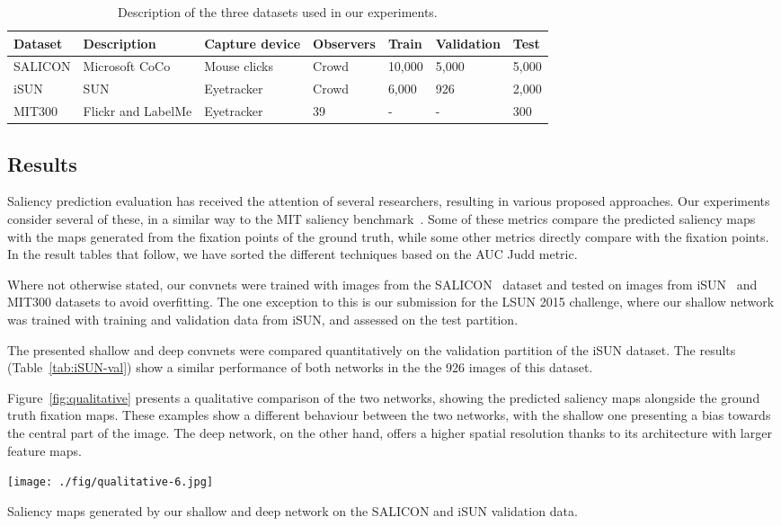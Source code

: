 \documentclass[10pt,twocolumn,letterpaper]{article}
\begin{document}
\begin{table*}
\begin{center}
\begin{tabular}{lllllll}
\toprule
Dataset							&	Description			 & Capture device 	& Observers & Train 	& Validation & Test \\
\midrule
SALICON	\cite{jiang2015salicon} & Microsoft CoCo \cite{lin2014microsoft} & Mouse clicks	& Crowd & 10,000 	& 5,000	& 5,000 \\
iSUN 	\cite{xu2015turkergaze} & SUN \cite{xiao2010sun} & Eyetracker	& Crowd & 6,000 	& 926	& 2,000 \\
MIT300 \cite{mit-saliency-benchmark}	& Flickr and LabelMe \cite{russell2008labelme} 	& Eyetracker	& 39 & - & -	& 300 \\
\bottomrule
\end{tabular}
\end{center}
\caption{Description of the three datasets used in our experiments.}
\label{tab:datasets}
\end{table*}\subsection{Results}

Saliency prediction evaluation has received the attention of several researchers, resulting in various proposed approaches.
Our experiments consider several of these, in a similar way to the MIT saliency benchmark~\cite{Judd_2012}. %
Some of these metrics compare the predicted saliency maps with the maps generated from the fixation points of the ground truth, while some other metrics directly compare with the fixation points.
In the result tables that follow, we have sorted the different techniques based on the AUC Judd metric.

Where not otherwise stated, our convnets were trained with images from the SALICON~\cite{jiang2015salicon} dataset and tested on images from iSUN~\cite{xu2015turkergaze} and MIT300 datasets to avoid overfitting.
The one exception to this is our submission for the LSUN 2015 challenge, where our shallow network was trained with training and validation data from iSUN, and assessed on the test partition.

The presented shallow and deep convnets were compared quantitatively on the validation partition of the iSUN dataset.
The results (Table~\ref{tab:iSUN-val}) show a similar performance of both networks in the the 926 images of this dataset.

Figure~\ref{fig:qualitative} presents a qualitative comparison of the two networks, showing the predicted saliency maps alongside the ground truth fixation maps.
These examples show a different behaviour between the two networks, with the shallow one presenting a bias towards the central part of the image.
The deep network, on the other hand, offers a higher spatial resolution thanks to its architecture with larger feature maps.
		\begin{center}
		\texttt{[image: ./fig/qualitative-6.jpg]}
        \end{center}
		\caption{Saliency maps generated by our shallow and deep network on the SALICON and iSUN validation data.}
		\label{fig:qualitative}
\end{document}

